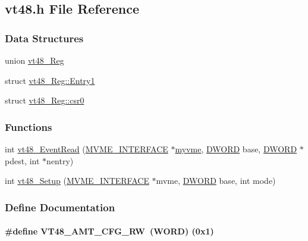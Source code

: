 \subsection{vt48.h File Reference}
\label{vt48_8h}
\subsubsection*{Data Structures}
\begin{DoxyCompactItemize}
\item 
union \hyperlink{unionvt48__Reg}{vt48\_\-Reg}
\item 
struct \hyperlink{structvt48__Reg_1_1Entry1}{vt48\_\-Reg::Entry1}
\item 
struct \hyperlink{structvt48__Reg_1_1csr0}{vt48\_\-Reg::csr0}
\end{DoxyCompactItemize}
\subsubsection*{Functions}
\begin{DoxyCompactItemize}
\item 
int \hyperlink{vt48_8h_a1cefc6582d808ef387ecc7016d9577fa}{vt48\_\-EventRead} (\hyperlink{structMVME__INTERFACE}{MVME\_\-INTERFACE} $\ast$\hyperlink{fevmemodules_8c_aeab89db2ad759342a32dcd50a0a0156c}{myvme}, \hyperlink{vt2_8h_a798af1e30bc65f319c1a246cecf59e39}{DWORD} base, \hyperlink{vt2_8h_a798af1e30bc65f319c1a246cecf59e39}{DWORD} $\ast$pdest, int $\ast$nentry)
\item 
int \hyperlink{vt48_8h_aa6237edcb797fb9ebb0d447a5b1edbcd}{vt48\_\-Setup} (\hyperlink{structMVME__INTERFACE}{MVME\_\-INTERFACE} $\ast$mvme, \hyperlink{vt2_8h_a798af1e30bc65f319c1a246cecf59e39}{DWORD} base, int mode)
\end{DoxyCompactItemize}


\subsubsection{Define Documentation}
\paragraph[{VT48\_\-AMT\_\-CFG\_\-RW}]{\setlength{\rightskip}{0pt plus 5cm}\#define VT48\_\-AMT\_\-CFG\_\-RW~({\bf WORD})  (0x1)}\hfill\label{vt48_8h_a00ad605e46d7aae22be02b1d68b42310}


